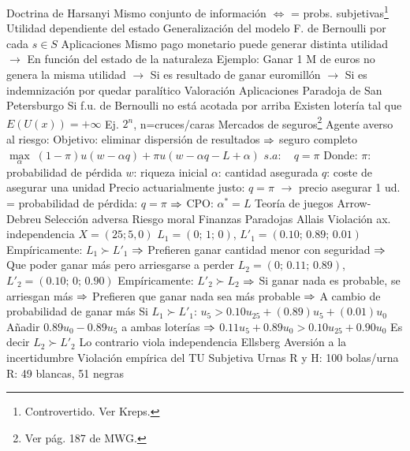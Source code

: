 \documentclass{nuevotema}
\begin{document}
\begin{esquemal}
				\4 {Doctrina de Harsanyi}
				\4[] Mismo conjunto de información
				\4[] $\iff$
				\4[] = probs. subjetivas\footnote{Controvertido. Ver Kreps.}
			\3 Utilidad dependiente del estado
				\4 Generalización del modelo
				\4 F. de Bernoulli por cada $s \in S$
				\4 Aplicaciones
				\4[] Mismo pago monetario puede generar distinta utilidad
				\4[] $\to$ En función del estado de la naturaleza
				\4 Ejemplo:
				\4[] Ganar 1 M de euros no genera la misma utilidad
				\4[] $\to$ Si es resultado de ganar euromillón
				\4[] $\to$ Si es indemnización por quedar paralítico
		\2 Valoración
			\3 Aplicaciones
				\4 {Paradoja de San Petersburgo}
				\4[] Si f.u. de Bernoulli no está acotada por arriba
				\4[] Existen lotería tal que $E\left( U(x) \right) = +\infty$
				\4[] Ej. $2^n$, n=cruces/caras
				\4 {Mercados de seguros}\footnote{Ver pág. 187 de MWG.}
				\4[] Agente averso al riesgo:
				\4[] Objetivo: eliminar dispersión de resultados
				\4[] $\Rightarrow$ seguro completo
				\4[] $\underset{\alpha}{\max} \; (1-\pi)u(w-\alpha q) + \pi u(w - \alpha q - L + \alpha)$
				\4[] $s.a: \quad q = \pi$
				\4[] Donde:
				\4[] $\pi$: probabilidad de pérdida
				\4[] $w$: riqueza inicial
				\4[] $\alpha$: cantidad asegurada
				\4[] $q$: coste de asegurar una unidad
				\4[] Precio actuarialmente justo: $q=\pi$
				\4[] $\to$ precio asegurar 1 ud. = probabilidad de pérdida: $q=\pi$
				\4[] $\Rightarrow$ CPO: $\alpha^* = L$
				\4 {Teoría de juegos}
				\4 {Arrow-Debreu}
				\4 {Selección adversa}
				\4 {Riesgo moral}
				\4 {Finanzas}
			\3 Paradojas
				\4 {Allais}
				\4[] Violación ax. independencia
				\4[] $X = (25; 5, 0)$
				\4[] $L_1 = (0; \, 1; \, 0)$, $L'_1 = (0.10; \, 0.89; \, 0.01)$
				\4[] Empíricamente: $L_1 \succ L'_1$
				\4[] $\Rightarrow$ Prefieren ganar cantidad menor con seguridad
				\4[] $\Rightarrow$ Que poder ganar más pero arriesgarse a perder
				\4[] $L_2 = (0; \, 0.11; \, 0.89)$, $L'_2=(0.10; \, 0; \, 0.90)$
				\4[] Empíricamente: $L'_2 \succ L_2$
				\4[] $\Rightarrow$ Si ganar nada es probable, se arriesgan más
				\4[] $\Rightarrow$ Prefieren que ganar nada sea más probable
				\4[] $\Rightarrow$ A cambio de probabilidad de ganar más
				\4[] Si $L_1 \succ L'_1$: $u_{5} > 0.10 u_{25} + (0.89) u_{5} + (0.01) u_0$
				\4[] Añadir $0.89 u_0 - 0.89 u_{5}$ a ambas loterías
				\4[] $\Rightarrow$ $0.11 u_{5} + 0.89 u_0 > 0.10 u_{25} + 0.90 u_0$
				\4[] Es decir $L_2 \succ L'_2$
				\4[] Lo contrario viola independencia
				\4 {Ellsberg}
				\4[] Aversión a la incertidumbre
				\4[] Violación empírica  del TU Subjetiva
				\4[] Urnas R y H: 100 bolas/urna
				\4[] R: 49 blancas, 51 negras

\end{esquemal}
\end{document}
